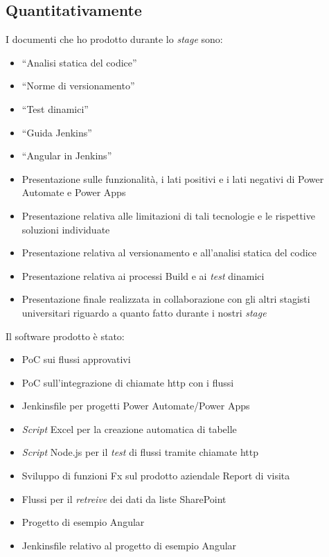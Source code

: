 \subsection{Quantitativamente}
I documenti che ho prodotto durante lo \emph{stage} sono:
\begin{itemize}
    \item “Analisi statica del codice” 
    \item “Norme di versionamento” 
    \item “Test dinamici”
    \item “Guida Jenkins” 
    \item “Angular in Jenkins” 
    \item Presentazione sulle funzionalità, i lati positivi e i lati negativi di Power Automate e Power Apps 
    \item Presentazione relativa alle limitazioni di tali tecnologie e le rispettive soluzioni individuate 
    \item Presentazione relativa al versionamento e all'analisi statica del codice 
    \item Presentazione relativa ai processi Build e ai \emph{test} dinamici 
    \item Presentazione finale realizzata in collaborazione con gli altri stagisti universitari riguardo a quanto fatto durante i nostri \emph{stage} 
\end{itemize}
 
\noindent Il software prodotto è stato: 
\begin{itemize}
    \item PoC sui flussi approvativi 
    \item PoC sull'integrazione di chiamate \gls{http} con i flussi  
    \item Jenkinsfile per progetti Power Automate/Power Apps 
    \item \emph{Script} Excel per la creazione automatica di tabelle 
    \item \emph{Script} Node.js per il \emph{test} di flussi tramite chiamate \gls{http} 
    \item Sviluppo di funzioni Fx sul prodotto aziendale Report di visita 
    \item Flussi per il \emph{retreive} dei dati da liste SharePoint 
    \item Progetto di esempio Angular 
    \item Jenkinsfile relativo al progetto di esempio Angular 
\end{itemize}
